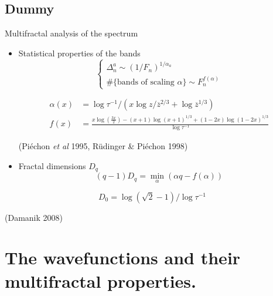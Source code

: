 \documentclass[xcolor=x11names,compress,professionalfonts]{beamer}
\renewcommand{\(}{\begin{columns}}
\renewcommand{\)}{\end{columns}}
\newcommand{\<}[1]{\begin{column}{#1}}
\renewcommand{\>}{\end{column}}
\newcommand{\zb}{\ensuremath{\overline{z}}}
\begin{document}
\subsection{Dummy}
\begin{frame}{Multifractal analysis of the spectrum}

%	
%

	\begin{itemize}
		\item 	Statistical properties of the bands
		\[
	\begin{cases}
	\Delta_n^a \sim (1/F_n)^{1/\alpha_a} \\
	\#\{\text{bands of scaling~} \alpha \} \sim F_n^{f(\alpha)} 
	\end{cases}
	\]
	
		\begin{align*}
		\alpha(x) &= \log \tau^{-1}/\left( x \log z/\zb^{2/3} + \log \zb^{1/3} \right) \\
		f(x) &= \frac{x \log \left(\frac{3 x}{2}\right)- (x+1) \log (x+1)^{1/3}+ (1-2 x) \log (1-2 x)^{1/3}}{\log \tau^{-1}}
	\end{align*}
	\begin{flushright}
	(Piéchon \emph{et al} 1995, Rüdinger \& Piéchon 1998)
	\end{flushright}
		\item Fractal dimensions $D_q$
			\[
				(q-1)D_q = \min_\alpha(\alpha q - f(\alpha))
			\]
	\end{itemize}
	\[ D_0 = \log(\sqrt{2}-1) / \log \tau^{-1} \]
	\begin{flushright}
	(Damanik 2008)
	\end{flushright}
\end{frame}

\section{The wavefunctions and their multifractal properties.}
\end{document}
